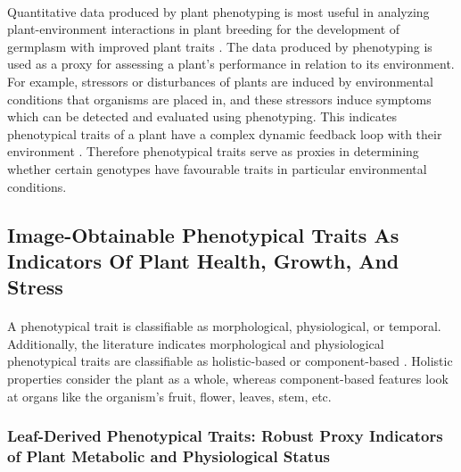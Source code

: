 \paragraph{}
Quantitative data produced by plant phenotyping is most useful in analyzing plant-environment interactions in plant breeding \cite{fioraniFutureScenariosPlant2013} for the development of germplasm with improved plant traits \cite{liReviewImagingTechniques2014}. The data produced by phenotyping is used as a proxy for assessing a plant's performance in relation to its environment. For example, stressors or disturbances of plants are induced by environmental conditions that organisms are placed in, and these stressors induce symptoms which can be detected and evaluated using phenotyping. This indicates phenotypical traits of a plant have a complex dynamic feedback loop with their environment \cite{walterPlantPhenotypingBean2015}. Therefore phenotypical traits serve as proxies in determining whether certain genotypes have favourable traits in particular environmental conditions.

\subsection{Image-Obtainable Phenotypical Traits As Indicators Of Plant Health, Growth, And Stress}

\paragraph{}
A phenotypical trait is classifiable as morphological, physiological, or temporal. Additionally, the literature indicates morphological and physiological phenotypical traits are classifiable as holistic-based or component-based \cite{daschoudhuryLeveragingImageAnalysis2019}. Holistic properties consider the plant as a whole, whereas component-based features look at organs like the organism's fruit, flower, leaves, stem, etc. 

\subsubsection{Leaf-Derived Phenotypical Traits: Robust Proxy Indicators of Plant Metabolic and Physiological Status}
